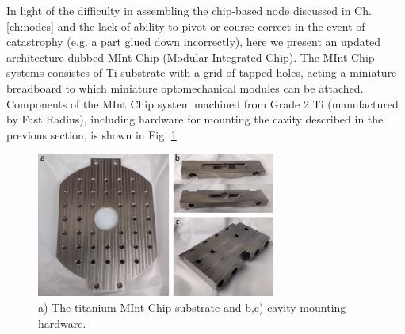 In light of the difficulty in assembling the chip-based node discussed in Ch. \ref{ch:nodes} and the lack of ability to pivot or course correct in the event of catastrophy (e.g. a part glued down incorrectly), here we present an updated architecture dubbed MInt Chip (Modular Integrated Chip). The MInt Chip systems consistes of Ti substrate with a grid of tapped holes, acting a miniature breadboard to which miniature optomechanical modules can be attached. Components of the MInt Chip system machined from Grade 2 Ti (manufactured by Fast Radius), including hardware for mounting the cavity described in the previous section, is shown in Fig. \ref{fig:mintchip}.
\begin{figure}[htb]
    \centering
    \includegraphics[width=0.7\textwidth]{Images/mint_chip.pdf}
    \caption{a) The titanium MInt Chip substrate and b,c) cavity mounting hardware.}
    \label{fig:mintchip}
\end{figure}

